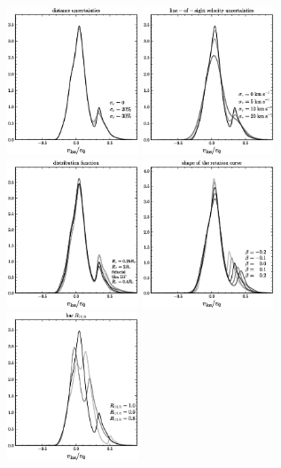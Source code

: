 \documentclass[12pt,preprint]{aastex}
\begin{document}
\clearpage
\begin{figure}
\includegraphics[width=0.35\textwidth]{distuncertain.ps}
\includegraphics[width=0.35\textwidth]{vlosuncertain.ps}\\
\includegraphics[width=0.35\textwidth]{df.ps}
\includegraphics[width=0.35\textwidth]{slope.ps}\\
\includegraphics[width=0.35\textwidth]{rolr.ps}

\end{figure}
\end{document}

